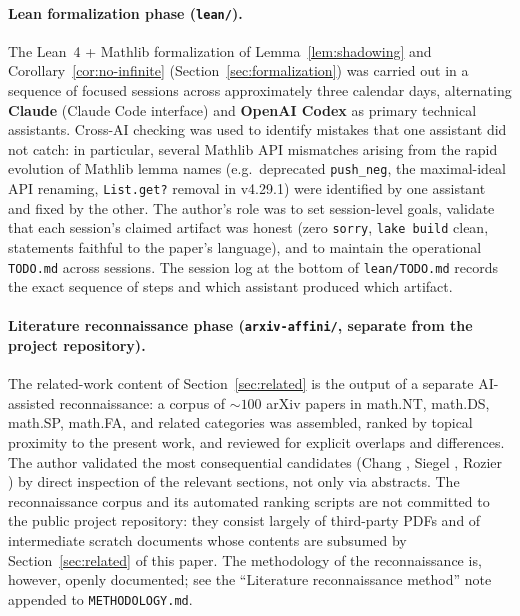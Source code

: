\documentclass[11pt,a4paper]{article}
\theoremstyle{definition}
\begin{document}
\paragraph{Lean formalization phase (\texttt{lean/}).}
The Lean~4 + Mathlib formalization of Lemma~\ref{lem:shadowing}
and Corollary~\ref{cor:no-infinite}
(Section~\ref{sec:formalization}) was carried out in a sequence
of focused sessions across approximately three calendar days,
alternating \textbf{Claude} (Claude Code interface) and
\textbf{OpenAI Codex} as primary technical assistants. Cross-AI
checking was used to identify mistakes that one assistant did
not catch: in particular, several Mathlib API mismatches arising
from the rapid evolution of Mathlib lemma names (e.g.\
deprecated \texttt{push\_neg}, the maximal-ideal API renaming,
\texttt{List.get?} removal in v4.29.1) were identified by one
assistant and fixed by the other. The author's role was to set
session-level goals, validate that each session's claimed
artifact was honest (zero \texttt{sorry}, \texttt{lake build}
clean, statements faithful to the paper's language), and to
maintain the operational \texttt{TODO.md} across sessions. The
session log at the bottom of \texttt{lean/TODO.md} records the
exact sequence of steps and which assistant produced which
artifact.

\paragraph{Literature reconnaissance phase
(\texttt{arxiv-affini/}, separate from the project repository).}
The related-work content of Section~\ref{sec:related} is the
output of a separate AI-assisted reconnaissance: a corpus of
$\sim 100$ arXiv papers in math.NT, math.DS, math.SP, math.FA, and
related categories was assembled, ranked by topical proximity to
the present work, and reviewed for explicit overlaps and
differences. The author validated the most consequential
candidates (Chang \cite{chang2026}, Siegel \cite{siegel2023a},
Rozier \cite{rozier2025}) by direct inspection of the relevant
sections, not only via abstracts. The reconnaissance corpus and
its automated ranking scripts are not committed to the public
project repository: they consist largely of third-party PDFs and
of intermediate scratch documents whose contents are subsumed by
Section~\ref{sec:related} of this paper. The methodology of the
reconnaissance is, however, openly documented; see the
``Literature reconnaissance method'' note appended to
\texttt{METHODOLOGY.md}.
\end{document}
